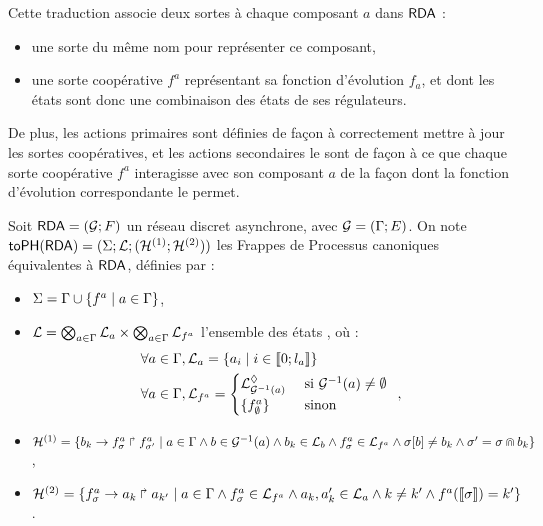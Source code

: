 Cette traduction associe deux sortes à chaque composant $a$ dans $\mathsf{RDA}$ :
\begin{itemize}
  \item une sorte du même nom pour représenter ce composant,
  \item une sorte coopérative $f^a$ représentant sa fonction d'évolution $f_a$,
    et dont les états sont donc une combinaison des états de ses régulateurs.
\end{itemize}
De plus, les actions primaires sont définies de façon à correctement mettre à jour
les sortes coopératives,
et les actions secondaires le sont de façon à ce que chaque sorte coopérative $f^a$
interagisse avec son composant $a$ de la façon dont la fonction d'évolution
correspondante le permet.

\begin{definition}
  Soit $\mathsf{RDA} = (\mathcal{G}; F)$ un réseau discret asynchrone, avec $\mathcal{G} = (\mathrm{\Gamma}; E)$.
  On note $\mathsf{toPH}(\mathsf{RDA}) = (\Sigma; \mathcal{L}; (\mathcal{H}^{(1)}; \mathcal{H}^{(2)}))$
  les Frappes de Processus canoniques équivalentes
  à $\mathsf{RDA}$, définies par :
  \begin{itemize}
    \item $\Sigma = \mathrm{\Gamma} \cup \{ f^a \mid a \in \mathrm{\Gamma} \}$,
    \item $\mathcal{L} = \bigotimes_{a \in \mathrm{\Gamma}} \mathcal{L}_{a} \times
      \bigotimes_{a \in \mathrm{\Gamma}} \mathcal{L}_{f^a}$ l'ensemble des états , où :
      \begin{align*}
      \forall a \in \mathrm{\Gamma}&, \mathcal{L}_{a} = \{ a_i \mid i \in \mathopen{\llbracket}0\mathclose{};l_a\mathclose{\rrbracket} \} \\
      \forall a \in \mathrm{\Gamma}&, \mathcal{L}_{f^a} = \begin{cases}
          \mathcal{L}^\lozenge_{\mathcal{G}^{-1}(a)} & \text{ si } \mathcal{G}^{-1}(a) \neq \emptyset \\
          \{ f^a_\emptyset \}  & \text{ sinon }
        \end{cases} \enspace,
      \end{align*}
    \item $\mathcal{H}^{(1)} = \{ b_k\rightarrow f^a_\sigma\Rsh f^a_{\sigma'} \mid
      a \in \mathrm{\Gamma} \wedge b \in \mathcal{G}^{-1}(a) \wedge
      b_k \in \mathcal{L}_{b} \wedge f^a_\sigma \in \mathcal{L}_{f^a} \wedge
      \sigma[{b}] \neq b_k \wedge \sigma' = \sigma \Cap b_k \}$,
    \item $\mathcal{H}^{(2)} = \{ f^a_\sigma\rightarrow a_k\Rsh a_{k'} \mid
      a \in \mathrm{\Gamma} \wedge f^a_\sigma \in \mathcal{L}_{f^a} \wedge
      a_k, a_k' \in \mathcal{L}_{a} \wedge k \neq k' \wedge f^a(\llbracket\sigma\rrbracket) = k' \}$.
  \end{itemize}
  

\end{definition}
